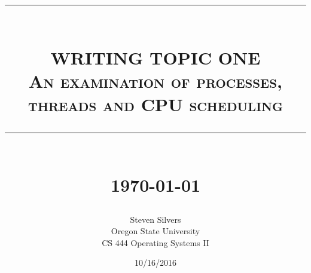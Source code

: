 \documentclass[10pt,serif,draftclsnofoot,onecolumn]{IEEEtran}
\newcommand{\HRule}[1]{\rule{\linewidth}{#1}}
\begin{document}
	\begin{titlepage}


	\title{ \normalsize \textsc{}
			\\ [2.0cm]
			\HRule{0.5pt} \\
			\LARGE \textbf{\uppercase{Writing topic one}}
			\\ \normalsize \textsc{An examination of processes, threads and CPU scheduling}
			\HRule{2pt} \\ [0.5cm]
			\normalsize \today \vspace*{5\baselineskip}}
	\date{10/16/2016}
	
	\author{Steven Silvers \\
			Oregon State University \\
			CS 444 Operating Systems II}
	\maketitle
	\end{titlepage}
	\newpage
	
\end{document}

